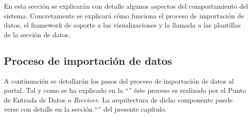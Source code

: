 En esta sección se explicarán con detalle algunos aspectos del comportamiento del sistema.  Concretamente se explicará cómo funciona el proceso de importación de datos, el framework de soporte a las visualizaciones y la llamada a las plantillas de la sección de datos.


\subsection{Proceso de importación de datos}
A continuación se detallarán los pasos del proceso de importación de datos al portal.  Tal y como se ha explicado en la ``'' éste proceso es realizado por el Punto de Entrada de Datos o \textit{Receiver}.  La arquitectura de dicho componente puede verse con detalle en la sección ``'' del presente capítulo.

